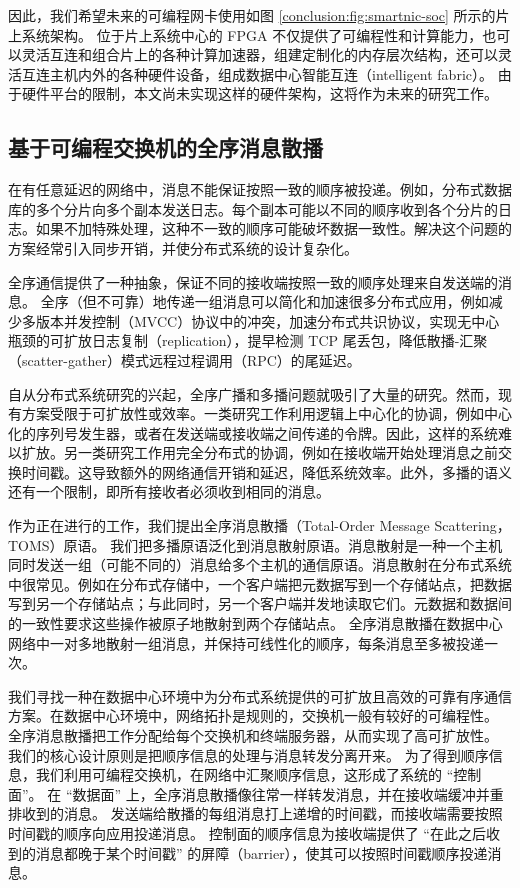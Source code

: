 因此，我们希望未来的可编程网卡使用如图 \ref{conclusion:fig:smartnic-soc} 所示的片上系统架构。
位于片上系统中心的 FPGA 不仅提供了可编程性和计算能力，也可以灵活互连和组合片上的各种计算加速器，组建定制化的内存层次结构，还可以灵活互连主机内外的各种硬件设备，组成数据中心智能互连（intelligent fabric）。
由于硬件平台的限制，本文尚未实现这样的硬件架构，这将作为未来的研究工作。

\subsection{基于可编程交换机的全序消息散播}


在有任意延迟的网络中，消息不能保证按照一致的顺序被投递。例如，分布式数据库的多个分片向多个副本发送日志。每个副本可能以不同的顺序收到各个分片的日志。如果不加特殊处理，这种不一致的顺序可能破坏数据一致性。解决这个问题的方案经常引入同步开销，并使分布式系统的设计复杂化。

全序通信提供了一种抽象，保证不同的接收端按照一致的顺序处理来自发送端的消息。
全序（但不可靠）地传递一组消息可以简化和加速很多分布式应用，例如减少多版本并发控制（MVCC）协议中的冲突，加速分布式共识协议，实现无中心瓶颈的可扩放日志复制（replication），提早检测 TCP 尾丢包，降低散播-汇聚（scatter-gather）模式远程过程调用（RPC）的尾延迟。

自从分布式系统研究的兴起，全序广播和多播问题就吸引了大量的研究。然而，现有方案受限于可扩放性或效率。一类研究工作利用逻辑上中心化的协调，例如中心化的序列号发生器，或者在发送端或接收端之间传递的令牌。因此，这样的系统难以扩放。另一类研究工作用完全分布式的协调，例如在接收端开始处理消息之前交换时间戳。这导致额外的网络通信开销和延迟，降低系统效率。此外，多播的语义还有一个限制，即所有接收者必须收到相同的消息。

作为正在进行的工作，我们提出全序消息散播（Total-Order Message Scattering，TOMS）原语。
我们把多播原语泛化到消息散射原语。消息散射是一种一个主机同时发送一组（可能不同的）消息给多个主机的通信原语。消息散射在分布式系统中很常见。例如在分布式存储中，一个客户端把元数据写到一个存储站点，把数据写到另一个存储站点；与此同时，另一个客户端并发地读取它们。元数据和数据间的一致性要求这些操作被原子地散射到两个存储站点。
全序消息散播在数据中心网络中一对多地散射一组消息，并保持可线性化的顺序，每条消息至多被投递一次。

我们寻找一种在数据中心环境中为分布式系统提供的可扩放且高效的可靠有序通信方案。在数据中心环境中，网络拓扑是规则的，交换机一般有较好的可编程性。
全序消息散播把工作分配给每个交换机和终端服务器，从而实现了高可扩放性。
我们的核心设计原则是把顺序信息的处理与消息转发分离开来。
为了得到顺序信息，我们利用可编程交换机，在网络中汇聚顺序信息，这形成了系统的 ``控制面''。
在 ``数据面'' 上，全序消息散播像往常一样转发消息，并在接收端缓冲并重排收到的消息。
发送端给散播的每组消息打上递增的时间戳，而接收端需要按照时间戳的顺序向应用投递消息。
控制面的顺序信息为接收端提供了 ``在此之后收到的消息都晚于某个时间戳'' 的屏障（barrier），使其可以按照时间戳顺序投递消息。


